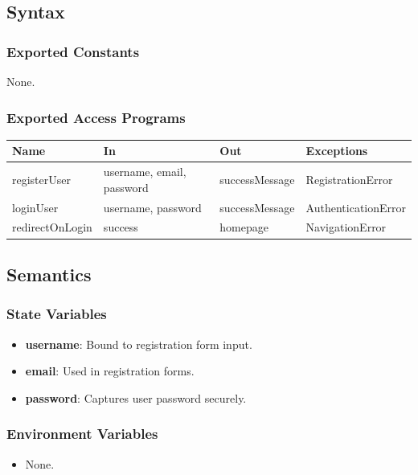 \documentclass[12pt, titlepage]{article}
\begin{document}
\subsection{Syntax}

\subsubsection{Exported Constants}
None.

\subsubsection{Exported Access Programs}

\begin{center}
  \begin{tabular}{|p{4cm}|p{4cm}|p{4cm}|}
    \hline
    \textbf{Name} & \textbf{In} & \textbf{Out} & \textbf{Exceptions} \\
    \hline
    registerUser & username, email, password & successMessage & RegistrationError \\
    \hline
    loginUser & username, password & successMessage & AuthenticationError \\
    \hline
    redirectOnLogin & success & homepage & NavigationError \\
    \hline
  \end{tabular}
\end{center}

\subsection{Semantics}

\subsubsection{State Variables}
\begin{itemize}
    \item \textbf{username}: Bound to registration form input.
    \item \textbf{email}: Used in registration forms.
    \item \textbf{password}: Captures user password securely.
\end{itemize}

\subsubsection{Environment Variables}
\begin{itemize}
    \item None.
\end{itemize}
\end{document}
